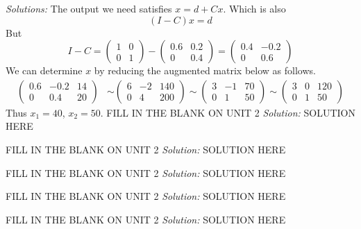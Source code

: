     \ifnum {} {\color{DarkBlue} \textit{Solutions:} 
    The output we need satisfies $x = d + Cx$. Which is also
    $$(I-C)x = d$$
    But 
    $$I-C 
    = \begin{pmatrix} 1&0\\0&1\end{pmatrix} - \begin{pmatrix} 0.6 & 0.2 \\ 0 & 0.4 \end{pmatrix} 
    = \begin{pmatrix} 0.4 & -0.2 \\ 0 & 0.6 \end{pmatrix}$$
    We can determine $x$ by reducing the augmented matrix below as follows. 
    \begin{align}
        \begin{pmatrix} 0.6 & -0.2 & 14\\ 0 &  0.4 & 20\end{pmatrix} 
        & 
        \sim \begin{pmatrix} 6 & -2 & 140\\ 0 &  4 & 200\end{pmatrix} 
        \sim \begin{pmatrix} 3 & -1 & 70\\ 0 &  1 & 50\end{pmatrix} 
        \sim \begin{pmatrix} 3 & 0 & 120\\ 0 & 1 & 50\end{pmatrix} 
    \end{align}
    Thus $x_1 = 40$, $x_2 = 50$. 
    } 
    \fi          
\fi 
\ifnum {} %
    FILL IN THE BLANK ON UNIT 2
    \ifnum {} {\color{DarkBlue} \textit{Solution:} SOLUTION HERE  } \fi    
\fi 

\ifnum {} %
    FILL IN THE BLANK ON UNIT 2
    \ifnum {} {\color{DarkBlue} \textit{Solution:} SOLUTION HERE  } \fi    
\fi 


\ifnum {} %
    FILL IN THE BLANK ON UNIT 2
    \ifnum {} {\color{DarkBlue} \textit{Solution:} SOLUTION HERE  } \fi    
\fi 


\ifnum {} %
    FILL IN THE BLANK ON UNIT 2
    \ifnum {} {\color{DarkBlue} \textit{Solution:} SOLUTION HERE  } \fi    
\fi 


\ifnum {} %
    FILL IN THE BLANK ON UNIT 2
    \ifnum {} {\color{DarkBlue} \textit{Solution:} SOLUTION HERE  } \fi    
\fi 
